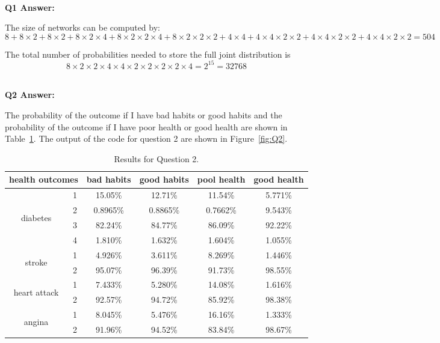 \documentclass[aps,letterpaper,10pt]{revtex4}
\begin{document}
~\\
\textbf{Q1 Answer:}

The size of networks can be computed by:
$$8+8\times2+8\times2+8\times2\times4+8\times2\times2\times4+8\times2\times2\times2+4\times4+4\times4\times2\times2+4\times4\times2\times2+4\times4\times2\times2 = 504$$

The total number of probabilities needed to store the full joint distribution is $$8\times 2\times 2\times 4 \times 4 \times 2 \times 2\times 2\times 2 \times 4 = 2^{15} = 32768$$


~\\
\textbf{Q2 Answer:} 

The probability of the outcome if I have bad habits or good habits and the probability of the outcome if I have poor health or good health are shown in Table~\ref{table:Q2}. The output of the code for question 2 are shown in Figure~\ref{fig:Q2}.

 \begin{table}[H]
    \centering
    \begin{tabular}{|c|c|c|c|c|c|}
    \hline
    \multicolumn{2}{|c|}{health outcomes} & bad habits & good habits & pool health & good health \\ \hline
    \multirow{4}{*}{diabetes}       & 1   & 15.05\%    & 12.71\%     & 11.54\%     & 5.771\%     \\ \cline{2-6} 
                                    & 2   & 0.8965\%   & 0.8865\%    & 0.7662\%    & 9.543\%     \\ \cline{2-6} 
                                    & 3   & 82.24\%    & 84.77\%     & 86.09\%     & 92.22\%     \\ \cline{2-6} 
                                    & 4   & 1.810\%    & 1.632\%     & 1.604\%     & 1.055\%     \\ \hline
    \multirow{2}{*}{stroke}         & 1   & 4.926\%    & 3.611\%     & 8.269\%     & 1.446\%     \\ \cline{2-6} 
                                    & 2   & 95.07\%    & 96.39\%     & 91.73\%     & 98.55\%     \\ \hline
    \multirow{2}{*}{heart attack}   & 1   & 7.433\%    & 5.280\%     & 14.08\%     & 1.616\%     \\ \cline{2-6} 
                                    & 2   & 92.57\%    & 94.72\%     & 85.92\%     & 98.38\%     \\ \hline
    \multirow{2}{*}{angina}         & 1   & 8.045\%    & 5.476\%     & 16.16\%     & 1.333\%     \\ \cline{2-6} 
                                    & 2   & 91.96\%    & 94.52\%     & 83.84\%     & 98.67\%     \\ \hline
    \end{tabular}
    \caption{Results for Question 2.}
    \label{table:Q2}
\end{table}
\end{document}

